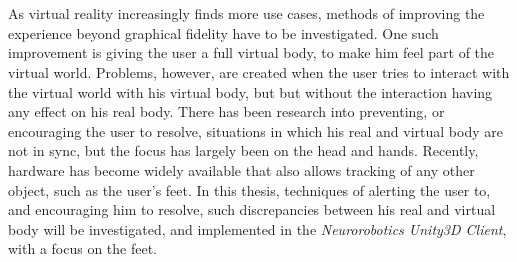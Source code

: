 \chapter{\abstractname}

As virtual reality increasingly finds more use cases, methods of improving the experience beyond graphical fidelity have to be investigated. One such improvement is giving the user a full virtual body, to make him feel part of the virtual world. Problems, however, are created when the user tries to interact with the virtual world with his virtual body, but but without the interaction having any effect on his real body. There has been research into preventing, or encouraging the user to resolve, situations in which his real and virtual body are not in sync, but the focus has largely been on the head and hands. Recently, hardware has become widely available that also allows tracking of any other object, such as the user's feet.
\newline
In this thesis, techniques of alerting the user to, and encouraging him to resolve, such discrepancies between his real and virtual body will be investigated, and implemented in the \textit{Neurorobotics Unity3D Client}, with a focus on the feet.









